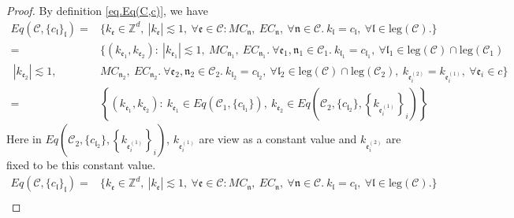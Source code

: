 \begin{proof} By definition \eqref{eq.Eq(C,c)}, we have
\begin{equation}
\begin{split}
    Eq(\mathcal{C},\{c_{\mathfrak{l}}\}_{\mathfrak{l}})=&\{k_{\mathfrak{e}}\in \mathbb{Z}^d,\ |k_{\mathfrak{e}}| \lesssim 1,\ \forall \mathfrak{e}\in \mathcal{C}:MC_{\mathfrak{n}},\  EC_{\mathfrak{n}},\ \forall \mathfrak{n}\in \mathcal{C}.\ k_{\mathfrak{l}}=c_{\mathfrak{l}},\ \forall \mathfrak{l}\in \text{leg}(\mathcal{C}).\} \\
    =&\{(k_{\mathfrak{e}_1},k_{\mathfrak{e}_2}):\ |k_{\mathfrak{e}_1}| \lesssim 1,\ MC_{\mathfrak{n}_1},\  EC_{\mathfrak{n}_1}.\ \forall \mathfrak{e}_1, \mathfrak{n}_1\in\mathcal{C}_1.\ k_{\mathfrak{l}_1}=c_{\mathfrak{l}_1},\ \forall \mathfrak{l}_1\in \text{leg}(\mathcal{C})\cap \text{leg}(\mathcal{C}_1)
    \\
    \ |k_{\mathfrak{e}_2}| \lesssim 1,\ &MC_{\mathfrak{n}_2},\  EC_{\mathfrak{n}_2}.\ \forall \mathfrak{e}_2, \mathfrak{n}_2\in\mathcal{C}_2.\ k_{\mathfrak{l}_2}=c_{\mathfrak{l}_2},\ \forall \mathfrak{l}_2\in \text{leg}(\mathcal{C})\cap \text{leg}(\mathcal{C}_2),\ k_{\mathfrak{e}_{i}^{(2)}}=k_{\mathfrak{e}_{i}^{(1)}},\ \forall\mathfrak{e}_{i}\in c\}
    \\
    =&\left\{(k_{\mathfrak{e}_1},k_{\mathfrak{e}_{2}}):\ k_{\mathfrak{e}_1}\in Eq(\mathcal{C}_1,\{c_{\mathfrak{l}_1}\}),\  k_{\mathfrak{e}_{2}}\in Eq\left(\mathcal{C}_{2}, \{c_{\mathfrak{l}_2}\}, \left\{k_{\mathfrak{e}_{i}^{(1)}}\right\}_{i}\right)\right\}
\end{split}
\end{equation}
Here in $Eq\left(\mathcal{C}_{2}, \{c_{\mathfrak{l}_2}\}, \left\{k_{\mathfrak{e}_{i}^{(1)}}\right\}_{i}\right)$, $k_{\mathfrak{e}_{i}^{(1)}}$ are view as a constant value and $k_{\mathfrak{e}_{i}^{(2)}}$ are fixed to be this constant value.
\begin{equation}
    \begin{split}
        Eq(\mathcal{C},\{c_{\mathfrak{l}}\}_{\mathfrak{l}})=&\{k_{\mathfrak{e}}\in \mathbb{Z}^d,\ |k_{\mathfrak{e}}| \lesssim 1,\ \forall \mathfrak{e}\in \mathcal{C}:MC_{\mathfrak{n}},\  EC_{\mathfrak{n}},\ \forall \mathfrak{n}\in \mathcal{C}.\ k_{\mathfrak{l}}=c_{\mathfrak{l}},\ \forall \mathfrak{l}\in \text{leg}(\mathcal{C}).\} \\

\end{split}
\end{equation}
\end{proof}

